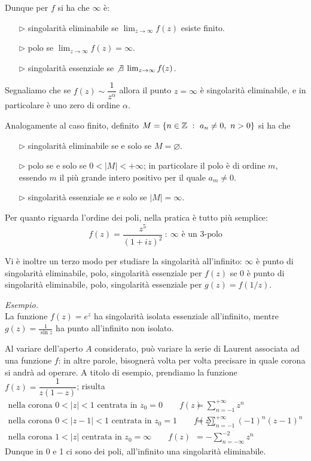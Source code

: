 Dunque per $f$ si ha che $\infty$ è:
\begin{enumerate}
    \item [$\triangleright$] singolarità eliminabile se $\lim_{z\to \infty}f(z)$ esiste finito.
    \item [$\triangleright$] polo se $\lim_{z\to \infty}f(z)=\infty$.
    \item [$\triangleright$] singolarità essenziale se $\not\exists\lim_{z\to \infty}f(z)$.
\end{enumerate}

Segnaliamo che se $f(z)\sim\dfrac{1}{z^{\alpha}}$ allora il punto $z=\infty$ è singolarità eliminabile, e in particolare è uno zero di ordine $\alpha$.

Analogamente al caso finito, definito $M=\left\{n\in\mathbb{Z}\ :\ a_n\neq 0,\ n>0 \right\}$ si ha che
\begin{enumerate}
    \item [$\triangleright$] singolarità eliminabile se e solo se $M=\varnothing$.
    \item [$\triangleright$] polo se e solo se $0<|M|<+\infty$; in particolare il polo è di ordine $m$, essendo $m$ il più grande intero positivo per il quale $a_{m}\neq 0$.
    \item [$\triangleright$] singolarità essenziale se e solo se $|M|=\infty$.
\end{enumerate}

Per quanto riguarda l'ordine dei poli, nella pratica è tutto più semplice: 
\begin{equation*}
f(z)=\frac{z^5}{(1+iz)^2}\ :\ \infty\text{ è un 3-polo}
\end{equation*}

Vi è inoltre un terzo modo per studiare la singolarità all'infinito: $\infty$ è punto di singolarità eliminabile, polo, singolarità essenziale per $f(z)$ se 0 è punto di singolarità eliminabile, polo, singolarità essenziale per $g(z)=f(1/z)$.

\textit{Esempio.}\\
La funzione $f(z) = e^{z}$ ha singolarità isolata essenziale all'infinito, mentre $g(z) = \frac{1}{\sin z}$ ha punto all'infinito non isolato.

\newpage

\begin{rem}
Al variare dell'aperto $A$ considerato, può variare la serie di Laurent associata ad una funzione $f$: in altre parole, bisognerà volta per volta precisare in quale corona si andrà ad operare. A titolo di esempio, prendiamo la funzione $f(z)=\dfrac{1}{z(1-z)}$; risulta
\begin{align*}
\text{nella corona }0<|z|<1\text{ centrata in }z_0=0 \qquad f(z)&=\sum_{n=-1}^{+\infty} z^n \\
\text{nella corona }0<|z-1|<1\text{ centrata in }z_0=1 \qquad f(z)&=\sum_{n=-1}^{+\infty}(-1)^n(z-1)^n \\
\text{nella corona }1<|z|\text{ centrata in }z_0=\infty \qquad f(z)&=-\sum_{n=-\infty}^{-2}z^n
\end{align*}
Dunque in 0 e 1 ci sono dei poli, all'infinito una singolarità eliminabile.
\end{rem}


